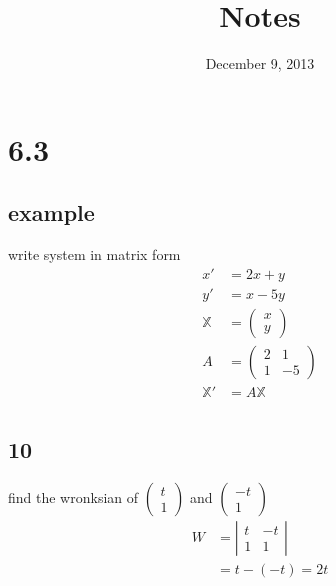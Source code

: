 \documentclass{article}
\begin{document}
\title{Notes}
\date{December 9, 2013}
\maketitle
\section*{6.3}
\subsection*{example}
write system in matrix form
\begin{align*}
  x'&=2x+y\\
  y'&=x-5y\\
  \mathbb{X}&=\left(\begin{array}{c}x\\y\end{array}\right)\\
  A&=\left(\begin{array}{cc}2&1\\1&-5\end{array}\right)\\
  \mathbb{X}'&=A\mathbb{X}\\
\end{align*}
\subsection*{10}
find the wronksian of $\left(\begin{array}{c}t\\1\end{array}\right)$ and $\left(\begin{array}{c}-t\\1\end{array}\right)$
\begin{align*}
  W&=\left\lvert\begin{array}{cc}t&-t\\1&1\end{array}\right\rvert\\
     &=t-(-t)=2t
\end{align*}
\end{document}
